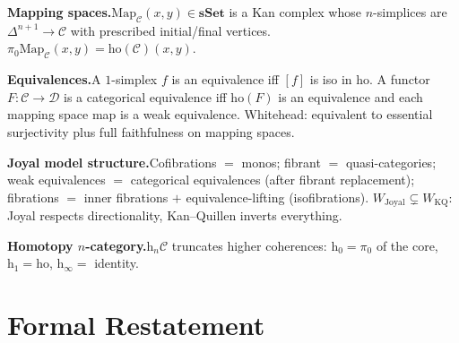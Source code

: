 \begin{summarybox}
\textbf{Mapping spaces.}\quad $\mathrm{Map}_\mathcal{C}(x, y) \in
\mathbf{sSet}$ is a Kan complex whose $n$-simplices are
$\Delta^{n+1} \to \mathcal{C}$ with prescribed initial/final vertices.
$\pi_0 \mathrm{Map}_\mathcal{C}(x, y) = \mathrm{ho}(\mathcal{C})(x, y)$.

\textbf{Equivalences.}\quad A $1$-simplex $f$ is an equivalence iff $[f]$
is iso in $\mathrm{ho}$. A functor $F : \mathcal{C} \to \mathcal{D}$ is a
categorical equivalence iff $\mathrm{ho}(F)$ is an equivalence and each
mapping space map is a weak equivalence. Whitehead: equivalent to
essential surjectivity plus full faithfulness on mapping spaces.

\textbf{Joyal model structure.}\quad Cofibrations $=$ monos; fibrant $=$
quasi-categories; weak equivalences $=$ categorical equivalences (after
fibrant replacement); fibrations $=$ inner fibrations $+$ equivalence-lifting
(isofibrations). $W_{\mathrm{Joyal}} \subsetneq W_{\mathrm{KQ}}$: Joyal
respects directionality, Kan–Quillen inverts everything.

\textbf{Homotopy $n$-category.}\quad $\mathrm{h}_n \mathcal{C}$
truncates higher coherences: $\mathrm{h}_0 = \pi_0$ of the core,
$\mathrm{h}_1 = \mathrm{ho}$, $\mathrm{h}_\infty = $ identity.
\end{summarybox}


\section*{Formal Restatement}

